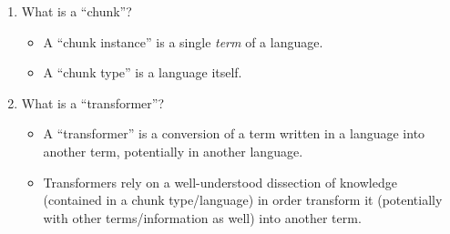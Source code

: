 \begin{enumerate}

      \item What is a ``chunk''?
            \begin{itemize}
                  \item A ``chunk instance'' is a single \textit{term} of a
                        language.
                  \item A ``chunk type'' is a language itself.
            \end{itemize}

      \item What is a ``transformer''?
            \begin{itemize}
                  \item A ``transformer'' is a conversion of a term written in a
                        language into another term, potentially in another language.
                  \item Transformers rely on a well-understood dissection of
                        knowledge (contained in a chunk type/language) in order
                        transform it (potentially with other terms/information
                        as well) into another term.
            \end{itemize}

\end{enumerate}